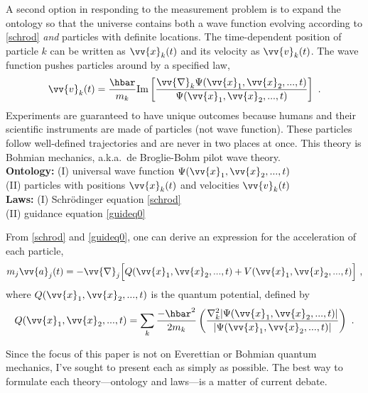 \documentclass[onecolumn,secnumarabic,balancelastpage,amsmath,amssymb,nofootinbib]{article}
\begin{document}
A second option in responding to the measurement problem is to expand the ontology so that the universe contains both a wave function evolving according to \eqref{schrod} \emph{and} particles with definite locations.  The time-dependent position of particle $k$ can be written as $\vv{x}_k(t)$ and its velocity as $\vv{v}_k(t)$.  The wave function pushes particles around by a specified law,
\begin{equation}
\vv{v}_k(t)=\frac{\hbar}{m_k}\mbox{Im}\left[\frac{\vv{\nabla}_k\Psi(\vv{x}_1,\vv{x}_2,...,t)}{\Psi(\vv{x}_1,\vv{x}_2,...,t)}\right]\ .
\label{guideq0}
\end{equation}
Experiments are guaranteed to have unique outcomes because humans and their scientific instruments are made of particles (not wave function).  These particles follow well-defined trajectories and are never in two places at once.  This theory is Bohmian mechanics, a.k.a.\ de Broglie-Bohm pilot wave theory.
\vspace*{6 pt}\\\hspace*{1.2cm}\textbf{Ontology:} (I) universal wave function $\Psi(\vv{x}_1,\vv{x}_2,...,t)$
\\\hspace*{1.2cm}(II) particles with positions $\vv{x}_k(t)$ and velocities $\vv{v}_k(t)$
\\\hspace*{1.2cm}\textbf{Laws:} (I) Schr\"{o}dinger equation \eqref{schrod}
\\\hspace*{1.2cm}(II) guidance equation \eqref{guideq0}\vspace*{6 pt}

From \eqref{schrod} and \eqref{guideq0}, one can derive an expression for the acceleration of each particle,
\begin{equation}
m_j \vv{a}_j(t)=-\vv{\nabla}_j\Big[Q(\vv{x}_1,\vv{x}_2,...,t)+V(\vv{x}_1,\vv{x}_2,...,t)\Big]\ ,
\label{oldeom}
\end{equation}
where $Q(\vv{x}_1,\vv{x}_2,...,t)$ is the quantum potential, defined by
\begin{equation}
Q(\vv{x}_1,\vv{x}_2,...,t)=\sum_k \frac{-\hbar^2}{2 m_k }\left(\frac{\nabla_k^2 |\Psi(\vv{x}_1,\vv{x}_2,...,t)|}{|\Psi(\vv{x}_1,\vv{x}_2,...,t)|}\right)\ .
\label{defofQ}
\end{equation}

Since the focus of this paper is not on Everettian or Bohmian quantum mechanics, I've sought to present each as simply as possible.  The best way to formulate each theory---ontology and laws---is a matter of current debate.
\end{document}
